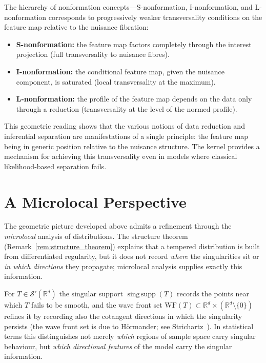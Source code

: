 \documentclass[11pt,a4paper]{article}
\newcommand{\R}{\mathbb{R}}
\newcommand{\cS}{\mathcal{S}}
\begin{document}
The hierarchy of nonformation concepts---S-nonformation,
I-nonformation, and L-nonforma\-tion corresponds to progressively
weaker transversality conditions on the feature map relative to the
nuisance fibration:
\begin{itemize}
\item \textbf{S-nonformation:} the feature map factors completely
  through the interest projection (full transversality to nuisance
  fibres).
\item \textbf{I-nonformation:} the conditional feature map, given the
  nuisance component, is saturated (local transversality at the
  maximum).
\item \textbf{L-nonformation:} the profile of the feature map
  depends on the data only through a reduction (transversality at
  the level of the normed profile).
\end{itemize}
This geometric reading shows that the various notions of data
reduction and inferential separation are manifestations of a single
principle: the feature map being in generic position relative to the
nuisance structure.  The kernel provides a mechanism for achieving
this transversality even in models where classical likelihood-based
separation fails.


\section{A Microlocal Perspective}
\label{sec:microlocal}

The geometric picture developed above admits a refinement through the
\emph{microlocal} analysis of distributions.  The structure theorem
(Remark~\ref{rem:structure_theorem}) explains that a tempered distribution is
built from differentiated regularity, but it does not record \emph{where} the
singularities sit or \emph{in which directions} they propagate; microlocal
analysis supplies exactly this information.

For $T\in\cS'(\R^d)$ the singular support $\operatorname{sing\,supp}(T)$
records the points near which $T$ fails to be smooth, and the wave front set
$\mathrm{WF}(T)\subset \R^d\times(\R^d\setminus\{0\})$ refines it by recording
also the cotangent directions in which the singularity persists (the wave
front set is due to H\"ormander; see Strichartz~\cite{Strichartz2003}).  In
statistical terms this distinguishes not merely \emph{which} regions of sample
space carry singular behaviour, but \emph{which directional features} of the
model carry the singular information.
\end{document}
